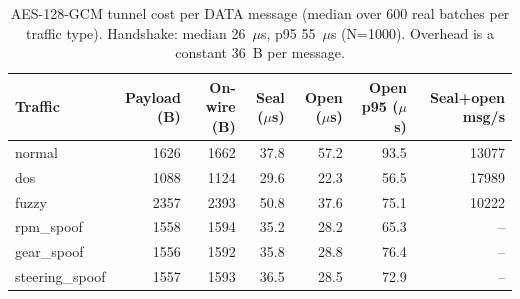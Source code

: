 \begin{table}[t]
\centering
\caption{AES-128-GCM tunnel cost per DATA message (median over 600 real batches per traffic type). Handshake: median 26~$\mu$s, p95 55~$\mu$s (N=1000). Overhead is a constant 36~B per message.}
\label{tab:sys_microbench}
\footnotesize
\begin{tabular}{lrrrrrr}
\toprule
Traffic & Payload (B) & On-wire (B) & Seal ($\mu$s) & Open ($\mu$s) & Open p95 ($\mu$s) & Seal+open msg/s \\
\midrule
normal & 1626 & 1662 & 37.8 & 57.2 & 93.5 & 13077 \\
dos & 1088 & 1124 & 29.6 & 22.3 & 56.5 & 17989 \\
fuzzy & 2357 & 2393 & 50.8 & 37.6 & 75.1 & 10222 \\
rpm_spoof & 1558 & 1594 & 35.2 & 28.2 & 65.3 & -- \\
gear_spoof & 1556 & 1592 & 35.8 & 28.8 & 76.4 & -- \\
steering_spoof & 1557 & 1593 & 36.5 & 28.5 & 72.9 & -- \\
\bottomrule
\end{tabular}
\end{table}
